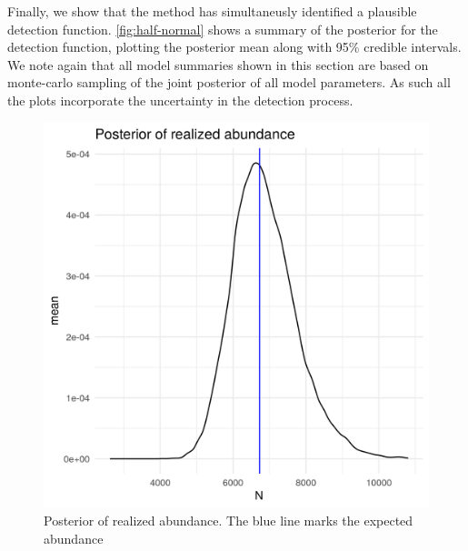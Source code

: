 \documentclass[preprint,12pt]{elsarticle}
\begin{document}
Finally, we show that the method has simultaneusly identified a plausible detection function.  \autoref{fig:half-normal} shows a summary of the posterior for the detection function, plotting the posterior mean along with 95\% credible intervals.  We note again that all model summaries shown in this section are based on monte-carlo sampling of the joint posterior of all model parameters.  As such all the plots incorporate the uncertainty in the detection process.  
\begin{figure}
	\includegraphics[scale=0.6]{figures/realized_abundance_posterior.png}
	\caption{Posterior of realized abundance.  The blue line marks the expected abundance}
	\label{fig:realized-abundance-posterior}
\end{figure}
\end{document}

